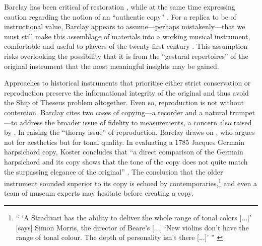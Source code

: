 Barclay has been critical of restoration \cite{barclay_care_1997}, while at the
same time expressing caution regarding the notion of an ``authentic copy''
\cite{barclay_preservation_2005}. For a replica to be of instructional value,
Barclay appears to assume---perhaps mistakenly---that we must still make this
assemblage of materials into a working musical instrument, comfortable and
useful to players of the twenty-first century \cite{barclay_preservation_2005}.
This assumption risks overlooking the possibility that it is from the ``gestural
repertoires'' \cite{levinson_music_1990} of the original instrument that the
most meaningful insights may be gained.

Approaches to historical instruments that prioritise either strict conservation
or reproduction preserve the informational integrity of the original and thus
avoid the Ship of Theseus problem altogether. Even so, reproduction is not
without contention. Barclay cites two cases of copying---a recorder and a natural
trumpet---to address the broader issue of fidelity to measurements, a concern also
raised by \textcite{koster_exact_1994}. In raising the ``thorny issue''
\cite{barclay_preservation_2005} of reproduction, Barclay draws on
\textcite{koster_restoration_1996}, who argues not for aesthetics but for tonal
quality. In evaluating a 1785 Jacques Germain harpsichord copy, Koster concludes
that ``a direct comparison of the Germain harpsichord and its copy shows that
the tone of the copy does not quite match the surpassing elegance of the
original'' \cite{koster_restoration_1996}. The conclusion that the older
instrument sounded superior to its copy is echoed by contemporaries,\footnote{``
`A Stradivari has the ability to deliver the whole range of tonal colors [...]'
[says] Simon Morris, the director of Beare’s [...] `New violins don’t have the
range of tonal colour. The depth of personality isn’t there [...]' ''
\cite{mead_musical_2014}} and even a team of museum experts may hesitate before
creating a copy.


